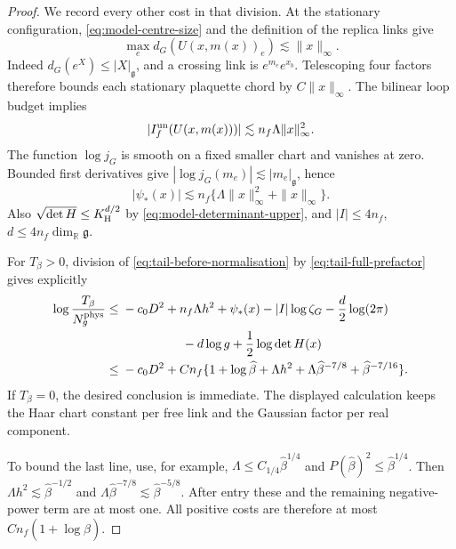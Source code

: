 \documentclass[11pt,reqno]{amsart}
\numberwithin{equation}{section}
\theoremstyle{definition}
\theoremstyle{remark}
\newcommand{\R}{\mathbb R}
\newcommand{\g}{\mathfrak g}
\begin{document}
\begin{proof}
We record every other cost in that division. At the
stationary configuration, \eqref{eq:model-centre-size}
and the definition of the replica links give
\[
       \max_e d_G(U(x,m(x))_e)
                            \lesssim\|x\|_\infty.
\]
Indeed \(d_G(e^X)\le|X|_{\g}\), and a crossing link is
\(e^{m_e}e^{x_b}\). Telescoping four factors therefore
bounds each stationary plaquette chord by
\(C\|x\|_\infty\). The bilinear loop budget implies
\[
       |I_f^{\rm un}(U(x,m(x)))|
                       \lesssim n_f\Lambda\|x\|_\infty^2.
\]
The function \(\log j_G\) is smooth on a fixed smaller
chart and vanishes at zero. Bounded first derivatives
give \(|\log j_G(m_e)|\lesssim|m_e|_{\g}\), hence
\begin{equation}
       |\psi_*(x)|\lesssim n_f
                    \{\Lambda\|x\|_\infty^2+\|x\|_\infty\}.
 \label{eq:tail-centre-loop-haar-price}
\end{equation}
Also \(\sqrt{\det H}\le K_{\rm H}^{d/2}\) by
\eqref{eq:model-determinant-upper}, and
\(|I|\le4n_f\), \(d\le4n_f\dim_{\R}\g\).

For \(T_\beta>0\), division of
\eqref{eq:tail-before-normalisation} by
\eqref{eq:tail-full-prefactor} gives explicitly
\begin{align*}
 \log\frac{T_\beta}{N_g^{\mathrm{phys}}}
       \le{}&-c_0D^2+n_f\Lambda h^2+\psi_*(x)
                  -|I|\log\zeta_G-\frac d2\log(2\pi)\\
             &\hspace{17mm}-d\log g
                              +\frac12\log\det H(x)\\
       \le{}&-c_0D^2+Cn_f
          \{1+\log\widehat\beta+\Lambda h^2
                +\Lambda\widehat\beta^{-7/8}
                +\widehat\beta^{-7/16}\}.
\end{align*}
If \(T_\beta=0\), the desired conclusion is immediate.
The displayed calculation keeps the Haar chart constant
per free link and the Gaussian factor per real component.

To bound the last line, use, for example,
\(\Lambda\le C_{1/4}\widehat\beta^{1/4}\) and
\(P(\widehat\beta)^2\le\widehat\beta^{1/4}\).
Then \(\Lambda h^2\lesssim\widehat\beta^{-1/2}\) and
\(\Lambda\widehat\beta^{-7/8}\lesssim\widehat\beta^{-5/8}\).
After entry these and the remaining negative-power term
are at most one. All positive costs are therefore at most
\(Cn_f(1+\log\widehat\beta)\).


\end{proof}
\end{document}
